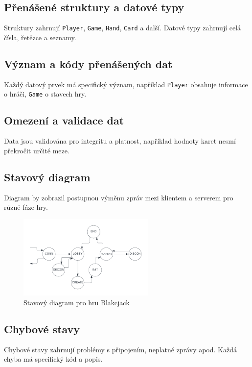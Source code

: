 \documentclass{article}
\begin{document}
\subsection{Přenášené struktury a datové typy}
Struktury zahrnují \texttt{Player}, \texttt{Game}, \texttt{Hand}, \texttt{Card} a další. Datové typy zahrnují celá čísla, řetězce a seznamy.

\subsection{Význam a kódy přenášených dat}
Každý datový prvek má specifický význam, například \texttt{Player} obsahuje informace o hráči, \texttt{Game} o stavech hry.

\subsection{Omezení a validace dat}
Data jsou validována pro integritu a platnost, například hodnoty karet nesmí překročit určité meze.

\subsection{Stavový diagram}
Diagram by zobrazil postupnou výměnu zpráv mezi klientem a serverem pro různé fáze hry.

\begin{figure}[htbp] %
    \centering %
    \includegraphics[width=0.6\textwidth]{img/diagram.png} %
    \caption{Stavový diagram pro hru Blakcjack} %
    \label{fig:obrazek} %
\end{figure}

\subsection{Chybové stavy}
Chybové stavy zahrnují problémy s připojením, neplatné zprávy apod. Každá chyba má specifický kód a popis.
\end{document}
